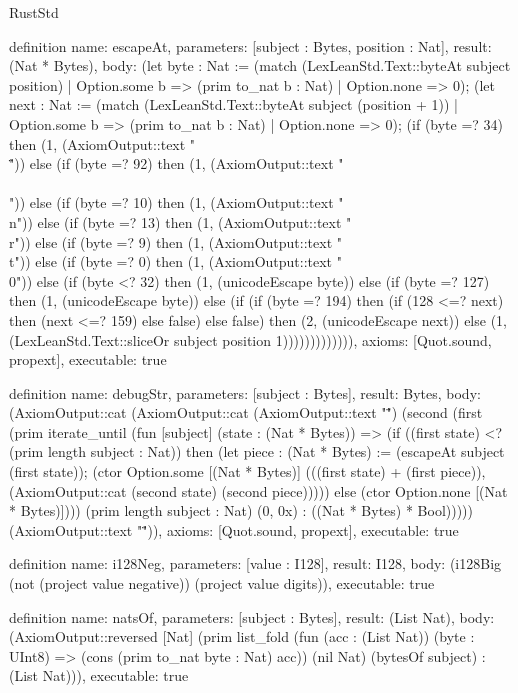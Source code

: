 \begin{lexlean}{RustStd}
\begin{semanticmodule}
definition{
  name: escapeAt,
  parameters: [subject : Bytes, position : Nat],
  result: (Nat * Bytes),
  body: (let byte : Nat := (match (LexLeanStd.Text::byteAt subject position)
    | Option.some b => (prim to_nat b : Nat)
    | Option.none => 0); (let next : Nat := (match (LexLeanStd.Text::byteAt subject (position + 1))
    | Option.some b => (prim to_nat b : Nat)
    | Option.none => 0); (if (byte =? 34) then (1, (AxiomOutput::text "\\\"")) else (if (byte =? 92) then (1, (AxiomOutput::text "\\\\")) else (if (byte =? 10) then (1, (AxiomOutput::text "\\n")) else (if (byte =? 13) then (1, (AxiomOutput::text "\\r")) else (if (byte =? 9) then (1, (AxiomOutput::text "\\t")) else (if (byte =? 0) then (1, (AxiomOutput::text "\\0")) else (if (byte <? 32) then (1, (unicodeEscape byte)) else (if (byte =? 127) then (1, (unicodeEscape byte)) else (if (if (byte =? 194) then (if (128 <=? next) then (next <=? 159) else false) else false) then (2, (unicodeEscape next)) else (1, (LexLeanStd.Text::sliceOr subject position 1))))))))))))),
  axioms: [Quot.sound, propext],
  executable: true
}

definition{
  name: debugStr,
  parameters: [subject : Bytes],
  result: Bytes,
  body: (AxiomOutput::cat (AxiomOutput::cat (AxiomOutput::text "\"") (second (first (prim iterate_until (fun [subject] (state : (Nat * Bytes)) => (if ((first state) <? (prim length subject : Nat)) then (let piece : (Nat * Bytes) := (escapeAt subject (first state)); (ctor Option.some [(Nat * Bytes)] (((first state) + (first piece)), (AxiomOutput::cat (second state) (second piece))))) else (ctor Option.none [(Nat * Bytes)]))) (prim length subject : Nat) (0, 0x) : ((Nat * Bytes) * Bool))))) (AxiomOutput::text "\"")),
  axioms: [Quot.sound, propext],
  executable: true
}

definition{
  name: i128Neg,
  parameters: [value : I128],
  result: I128,
  body: (i128Big (not (project value negative)) (project value digits)),
  executable: true
}

definition{
  name: natsOf,
  parameters: [subject : Bytes],
  result: (List Nat),
  body: (AxiomOutput::reversed [Nat] (prim list_fold (fun (acc : (List Nat)) (byte : UInt8) => (cons (prim to_nat byte : Nat) acc)) (nil Nat) (bytesOf subject) : (List Nat))),
  executable: true
}


\end{semanticmodule}
\end{lexlean}
